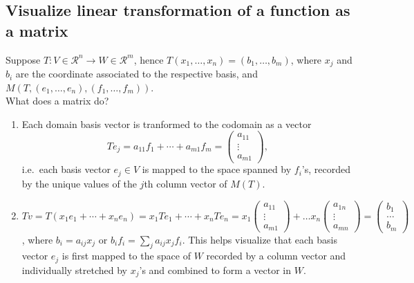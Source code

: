 \subsection{Visualize linear transformation of a function as a matrix} 
Suppose $T: V \in \mathcal{R}^n \rightarrow W \in \mathcal{R}^m$, hence $T(x_1,\ldots,x_n) =
(b_1,\ldots,b_m)$, where $x_j$ and $b_i$ are the coordinate associated to the respective basis, and
$M(T,(e_1,\ldots,e_n),(f_1,\ldots,f_m))$. \\ 
What does a matrix do?  
\begin{enumerate} 
    \item Each domain basis vector is tranformed to the codomain as a vector 
        \begin{equation} 
            Te_j = a_{11}f_1 + \cdots + a_{m1}f_m = 
            \begin{pmatrix} a_{11} \\ \vdots \\ a_{m1} \end{pmatrix}, 
        \end{equation} 
        i.e.\, each basis vector $e_j \in V$ is mapped to the space spanned by $f_i$'s, recorded by the
        unique values of the $j$th column vector of $M(T)$.  
    \item $Tv = T(x_{1}e_{1} + \cdots + x_{n}e_{n}) = x_{1}Te_{1} + \cdots + x_{n}Te_{n} = x_{1}
        \begin{pmatrix} a_{11} \\ \vdots \\ a_{m1} \end{pmatrix} +
        \ldots x_{n} {\begin{pmatrix} a_{1n} \\ \vdots \\ a_{mn}\end{pmatrix}} =
        \begin{pmatrix} b_{1} \\ \ldots \\ b_{m} \end{pmatrix}$, where $b_{i} = a_{ij}
        x_{j}$ or $b_{i}f_{i} = \sum_{j} a_{ij} x_{j}f_{i}$. 
        This helps visualize that each basis vector $e_j$ is first mapped to the space of $W$ recorded by a
        column vector and individually stretched by $x_j$'s and combined to form a vector in $W$.  
\end{enumerate}

